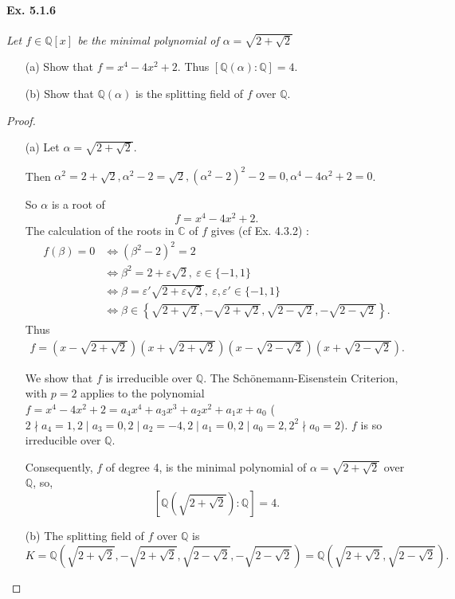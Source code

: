 \documentclass[11pt,a4paper]{article}
\newcommand{\Q}{\mathbb{Q}}
\newcommand{\C}{\mathbb{C}}
\begin{document}
\paragraph{Ex. 5.1.6}

{\it Let $f\in \Q[x]$ be the minimal polynomial of $\alpha = \sqrt{2+\sqrt{2}}$
\begin{enumerate}
\item[(a)] Show that $f = x^4-4x^2+2$. Thus $[\Q(\alpha) : \Q]=4$.
\item[(b)] Show that $\Q(\alpha)$ is the splitting field of $f$ over $\Q$.
\end{enumerate}
}

\begin{proof}
\begin{enumerate}
\item[(a)]
Let $\alpha= \sqrt{2+\sqrt{2}}$. 

Then $\alpha^2 = 2 + \sqrt{2}, \alpha^2-2 = \sqrt{2}, (\alpha^2-2)^2 - 2= 0, \alpha^4 - 4 \alpha^2 + 2 = 0$.

 So $\alpha$ is a root of
$$f= x^4-4x^2+2.$$
The calculation of the roots in $\C$ of $f$ gives (cf Ex. 4.3.2) : 
\begin{align*}
f(\beta) = 0 &\iff (\beta^2-2)^2 = 2\\
&\iff \beta^2 = 2 +\varepsilon \sqrt{2}, \ \varepsilon \in \{-1,1\}\\
&\iff \beta =\varepsilon' \sqrt{2 +\varepsilon \sqrt{2}},\  \varepsilon, \varepsilon' \in \{-1,1\}\\
&\iff \beta \in \left\{   \sqrt{2+\sqrt{2}}, -\sqrt{2+\sqrt{2}}, \sqrt{2-\sqrt{2}},-\sqrt{2-\sqrt{2}}\right\}.
\end{align*}
Thus 
\begin{align}
f = \left(x-\sqrt{2+\sqrt{2}}\right)\left(x+\sqrt{2+\sqrt{2}}\right)\left(x-\sqrt{2-\sqrt{2}}\right)\left(x+\sqrt{2-\sqrt{2}}\right).
\end{align}

We show that $f$ is irreducible over $\Q$.
The Sch\"onemann-Eisenstein Criterion,  with $p=2$ applies to the polynomial $f= x^4-4x^2+2 = a_4x^4+a_3x^3+a_2x^2+a_1x+a_0$ 
($2 \nmid a_4 =1, 2 \mid a_3=0,2\mid a_2=-4, 2 \mid a_1=0,2 \mid a_0=2,  2^2 \nmid a_0 = 2$). $f$ is so irreducible over $\mathbb{Q}$.

Consequently, $f$ of degree 4, is the minimal polynomial of $\alpha=  \sqrt{2+\sqrt{2}}$ over $\Q$, so,
$$\left[\Q\left(\sqrt{2+\sqrt{2}}\right):\Q\right] = 4.$$

\item[(b)]
The splitting field of $f$ over $\Q$ is $$K=\Q\left( \sqrt{2+\sqrt{2}}, -\sqrt{2+\sqrt{2}}, \sqrt{2-\sqrt{2}},-\sqrt{2-\sqrt{2}}\right) = \Q\left( \sqrt{2+\sqrt{2}} , \sqrt{2-\sqrt{2}}\right).$$


\end{enumerate}
\end{proof}
\end{document}
